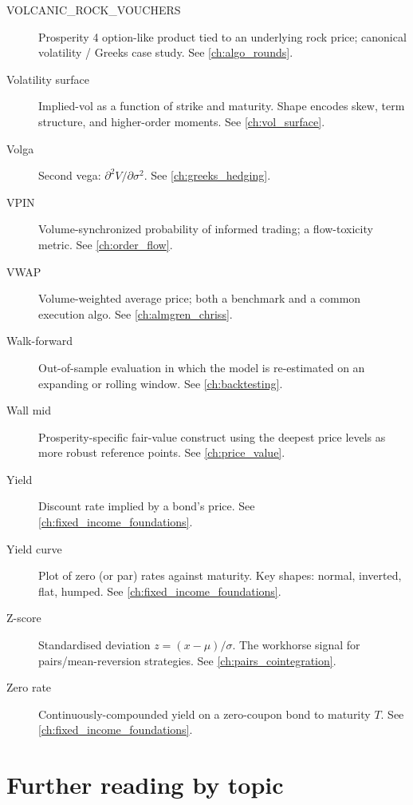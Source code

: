 \begin{description}
\item[VOLCANIC\_ROCK\_VOUCHERS]
Prosperity 4 option-like product tied to an underlying rock price;
canonical volatility / Greeks case study. See \cref{ch:algo_rounds}.

\item[Volatility surface]
Implied-vol as a function of strike and maturity. Shape encodes skew,
term structure, and higher-order moments. See \cref{ch:vol_surface}.

\item[Volga]
Second vega: $\partial^2 V/\partial\sigma^2$. See \cref{ch:greeks_hedging}.

\item[VPIN]
Volume-synchronized probability of informed trading; a flow-toxicity
metric. See \cref{ch:order_flow}.

\item[VWAP]
Volume-weighted average price; both a benchmark and a common execution
algo. See \cref{ch:almgren_chriss}.

\item[Walk-forward]
Out-of-sample evaluation in which the model is re-estimated on an
expanding or rolling window. See \cref{ch:backtesting}.

\item[Wall mid]
Prosperity-specific fair-value construct using the deepest price levels
as more robust reference points. See \cref{ch:price_value}.

\item[Yield]
Discount rate implied by a bond's price. See \cref{ch:fixed_income_foundations}.

\item[Yield curve]
Plot of zero (or par) rates against maturity. Key shapes: normal,
inverted, flat, humped. See \cref{ch:fixed_income_foundations}.

\item[Z-score]
Standardised deviation $z = (x-\mu)/\sigma$. The workhorse signal for
pairs/mean-reversion strategies. See \cref{ch:pairs_cointegration}.

\item[Zero rate]
Continuously-compounded yield on a zero-coupon bond to maturity $T$. See \cref{ch:fixed_income_foundations}.

\end{description}

\section{Further reading by topic}
\label{sec:app_further_reading}

